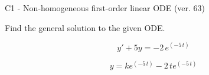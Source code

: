 \begin{exercise}
  \begin{exerciseTitle}C1 - Non-homogeneous first-order linear ODE (ver. 63)\end{exerciseTitle}
  \begin{exerciseStatement}
    
Find the general solution to the given ODE.

    
\[y'+5y= -2 \, e^{\left(-5 \, t\right)}\]

  \end{exerciseStatement}
  \begin{exerciseAnswer}
    
\[y= k e^{\left(-5 \, t\right)} - 2 \, t e^{\left(-5 \, t\right)}\]

  \end{exerciseAnswer}
\end{exercise}